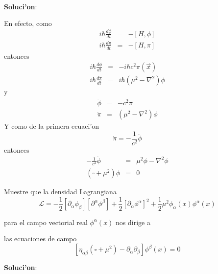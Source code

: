 \begin{enumerate}
\textbf{Soluci'on}:

En efecto, como
\begin{eqnarray*}
i\hbar \frac{d\phi }{dt} &=&-\left[ H,\phi \right] \\
i\hbar \frac{d\pi }{dt} &=&-\left[ H,\pi \right] 
\end{eqnarray*}
entonces
\begin{eqnarray*}
i\hbar \frac{d\phi }{dt} &=&-i\hbar c^{2}\pi \left( \vec{x}\right) \\
i\hbar \frac{d\pi }{dt} &=&i\hbar \left( \mu ^{2}-\nabla ^{2}\right)
\phi 
\end{eqnarray*}
y
\begin{eqnarray*}
\dot{\phi} &=&-c^{2}\pi \\
\dot{\pi} &=&\left( \mu ^{2}-\nabla ^{2}\right) \phi 
\end{eqnarray*}
Y como de la primera ecuaci'on
\begin{equation}
\dot{\pi}=-\frac{1}{c^{2}}\ddot{\phi}
\end{equation}
entonces
\begin{eqnarray*}
-\frac{1}{c^{2}}\ddot{\phi} &=&\mu ^{2}\phi -\nabla ^{2}\phi \\
\left( \square +\mu ^{2}\right) \phi &=&0
\end{eqnarray*}
\end{enumerate}

Muestre que la densidad Lagrangiana
\begin{equation}
\mathcal{L}=-\frac{1}{2}\left[ \partial _{\alpha }\phi _{\beta }\right] %
\left[ \partial ^{\alpha }\phi ^{\beta }\right] +\frac{1}{2}\left[ \partial
_{\alpha }\phi ^{\alpha }\right] ^{2}+\frac{1}{2}\mu ^{2}\phi _{\alpha
}(x) \phi ^{\alpha }(x) 
\end{equation}

para el campo vectorial real $\phi ^{\alpha }(x) $ nos dirige a

las ecuaciones de campo
\begin{equation}
\left[ \eta _{\alpha \beta }\left( \square +\mu ^{2}\right) -\partial
_{\alpha }\partial _{\beta }\right] \phi ^{\beta }(x) =0
\end{equation}

\textbf{Soluci'on}:


